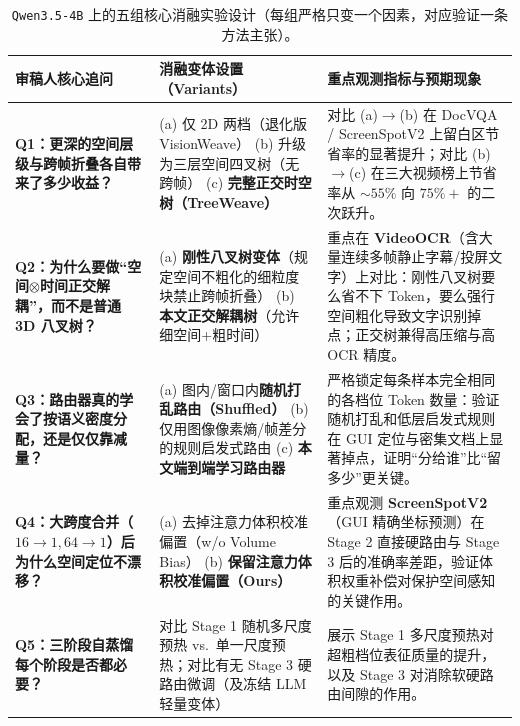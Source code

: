 \documentclass[11pt,a4paper]{ctexart}
\begin{document}
\begin{table}[H]
\centering
\footnotesize
\setlength{\tabcolsep}{5pt}
\caption{\texttt{Qwen3.5-4B} 上的五组核心消融实验设计（每组严格只变一个因素，对应验证一条方法主张）。}
\label{tab:ablations}
\begin{tabularx}{\linewidth}{@{}p{3.5cm} p{4.2cm} >{\raggedright\arraybackslash}X@{}}
\toprule
\textbf{审稿人核心追问} & \textbf{消融变体设置（Variants）} & \textbf{重点观测指标与预期现象} \\
\midrule
\textbf{Q1：更深的空间层级与跨帧折叠各自带来了多少收益？} &
(a) 仅 2D 两档（退化版 VisionWeave）\newline
(b) 升级为三层空间四叉树（无跨帧）\newline
(c) \textbf{完整正交时空树（TreeWeave）} &
对比 (a)$\to$(b) 在 DocVQA / ScreenSpotV2 上留白区节省率的显著提升；对比 (b)$\to$(c) 在三大视频榜上节省率从 $\sim 55\%$ 向 $75\%+$ 的二次跃升。 \\[4pt]
\textbf{Q2：为什么要做``空间$\otimes$时间正交解耦''，而不是普通 3D 八叉树？} &
(a) \textbf{刚性八叉树变体}（规定空间不粗化的细粒度块禁止跨帧折叠）\newline
(b) \textbf{本文正交解耦树}（允许细空间+粗时间） &
重点在 \textbf{VideoOCR}（含大量连续多帧静止字幕/投屏文字）上对比：刚性八叉树要么省不下 Token，要么强行空间粗化导致文字识别掉点；正交树兼得高压缩与高 OCR 精度。 \\[4pt]
\textbf{Q3：路由器真的学会了按语义密度分配，还是仅仅靠减量？} &
(a) 图内/窗口内\textbf{随机打乱路由（Shuffled）}\newline
(b) 仅用图像像素熵/帧差分的规则启发式路由\newline
(c) \textbf{本文端到端学习路由器} &
严格锁定每条样本完全相同的各档位 Token 数量：验证随机打乱和低层启发式规则在 GUI 定位与密集文档上显著掉点，证明``分给谁''比``留多少''更关键。 \\[4pt]
\textbf{Q4：大跨度合并（$16{\to}1, 64{\to}1$）后为什么空间定位不漂移？} &
(a) 去掉注意力体积校准偏置（w/o Volume Bias）\newline
(b) \textbf{保留注意力体积校准偏置（Ours）} &
重点观测 \textbf{ScreenSpotV2}（GUI 精确坐标预测）在 Stage 2 直接硬路由与 Stage 3 后的准确率差距，验证体积权重补偿对保护空间感知的关键作用。 \\[4pt]
\textbf{Q5：三阶段自蒸馏每个阶段是否都必要？} &
对比 Stage 1 随机多尺度预热 vs.\ 单一尺度预热；对比有无 Stage 3 硬路由微调（及冻结 LLM 轻量变体） &
展示 Stage 1 多尺度预热对超粗档位表征质量的提升，以及 Stage 3 对消除软硬路由间隙的作用。 \\
\bottomrule
\end{tabularx}
\end{table}
\end{document}
